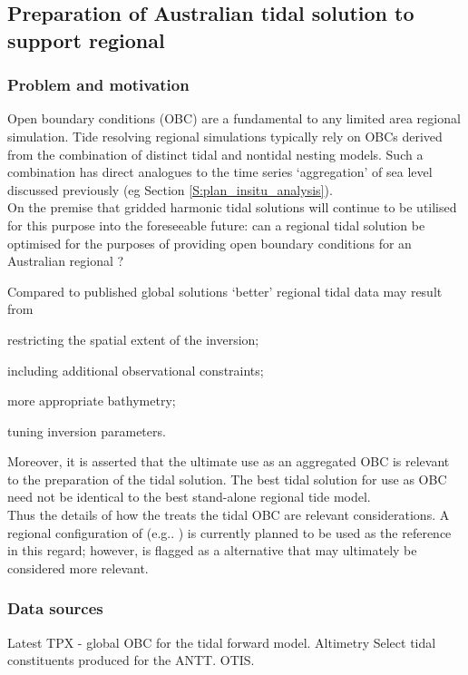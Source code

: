 \newpage
\subsection{Preparation of Australian tidal solution to support regional \OGCM{}}
\label{S:plan_OTIS}

\subsubsection{Problem and motivation}
Open boundary conditions (OBC) are a fundamental to any limited area regional \OGCM{} simulation.  
Tide resolving regional simulations typically rely on OBCs derived from the combination of distinct tidal and nontidal nesting models.   Such a combination has direct analogues to the time series `aggregation' of sea level discussed previously (eg Section \ref{S:plan_insitu_analysis}).\\
On the premise that gridded harmonic tidal solutions will continue to be utilised for this purpose into the foreseeable future:
\BoxBegin{}
can a regional tidal solution be optimised for the purposes of providing open boundary conditions for an Australian regional \OGCM{}?
\BoxEnd{}

Compared to published global solutions  `better' regional tidal data may result from 
\begin{inparaenum}[(a)]
\item restricting the spatial extent of the inversion;
\item including additional observational constraints;
\item more appropriate bathymetry;
\item tuning inversion parameters.
\end{inparaenum}

Moreover, it is asserted that the ultimate use as an aggregated OBC is relevant to the preparation of the tidal solution.   The best tidal solution for use as OBC need not be identical to the best stand-alone regional tide model.\\
Thus the details of how the \OGCM{} treats the tidal OBC are relevant considerations.  A regional configuration of \MOM{} (e.g.. \OFAMHR{}) is currently planned to be used as the reference in this regard; however, \ROMS{} is flagged as a alternative that may ultimately be considered more relevant.



\subsubsection{Data sources}
Latest TPX - global OBC for the tidal forward model.
Altimetry 
Select tidal constituents produced for the ANTT.
OTIS.



